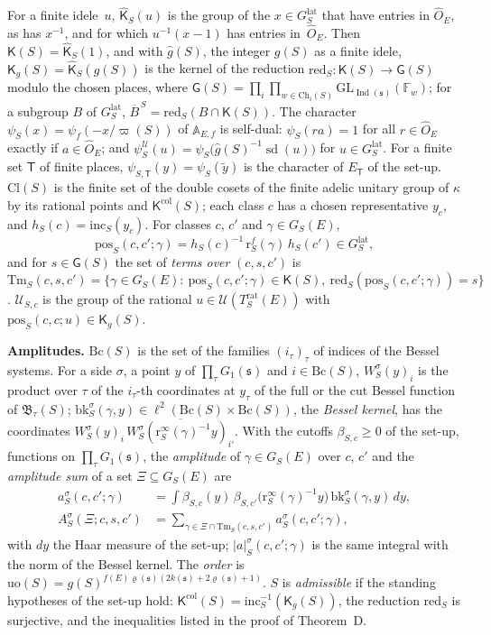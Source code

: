 \documentclass[11pt,a4paper]{article}
\newcommand{\F}{\mathbb{F}}
\newcommand{\m}[1]{\mbox{$#1$}}        %
\newcommand{\subhead}[1]{\par\addvspace{9pt plus 2pt}\Needspace{4\baselineskip}\noindent\textbf{#1}\enspace\ignorespaces}
\theoremstyle{plainx}
\theoremstyle{uprightx}
\newcommand{\fs}{\mathfrak{s}}                      %
\newcommand{\sT}{\mathsf{T}}                        %
\newcommand{\AEf}{\mathbb{A}_{E,f}}
\newcommand{\hO}{\hat{O}_E}
\newcommand{\GL}{\mathrm{GL}}
\newcommand{\rh}[1]{\varrho(#1)}                    %
\newcommand{\kk}[1]{k(#1)}                          %
\newcommand{\Ix}[1]{\operatorname{Ind}(#1)}                          %
\newcommand{\ninf}[1]{f(#1)}                        %
\newcommand{\ET}[1]{E_{#1}}                         %
\newcommand{\gS}[1]{g(#1)}                          %
\newcommand{\vpS}[1]{\varpi(#1)}                    %
\newcommand{\ChS}[2]{\mathrm{Ch}_{#2}(#1)}          %
\newcommand{\KcolS}[1]{\mathsf{K}^{\mathrm{col}}(#1)}        %
\newcommand{\BsysS}[2]{\mathfrak{B}_{#2}(#1)}       %
\newcommand{\Trat}[2]{T^{\mathrm{rat}}_{#1}(#2)}    %
\newcommand{\GS}[2]{G_{#1}(#2)}                     %
\newcommand{\GFin}[1]{G^{\mathrm{lat}}_{#1}}        %
\newcommand{\GRes}[1]{\mathsf{G}(#1)}               %
\newcommand{\Cl}[1]{\mathrm{Cl}(#1)}                %
\newcommand{\Bc}[1]{\mathrm{Bc}(#1)}                %
\newcommand{\KS}[1]{\mathsf{K}(#1)}                          %
\newcommand{\redS}[1]{\mathrm{red}_{#1}}            %
\newcommand{\KgS}[1]{\mathsf{K}_g(#1)}                       %
\newcommand{\redim}[2]{\overline{#2}^{\,#1}}        %
\newcommand{\gid}[1]{\hat{g}(#1)}                   %
\newcommand{\rinf}[1]{\mathrm{r}^{\infty}_{#1}}     %
\newcommand{\rfin}[1]{\mathrm{r}^{f}_{#1}}          %
\newcommand{\incH}[1]{\mathrm{inc}_{#1}}            %
\newcommand{\hc}[2]{h_{#1}(#2)}                     %
\newcommand{\pos}[4]{\mathrm{pos}_{#1}(#2,#3;#4)}   %
\newcommand{\terms}[4]{\mathrm{Tm}_{#1}(#2,#3,#4)}  %
\newcommand{\clU}[2]{\mathcal{U}_{#1,#2}}           %
\newcommand{\cutoff}[2]{\beta_{#1,#2}}              %
\newcommand{\besfn}[4]{W^{#1}_{#2}(#3)_{#4}}        %
\newcommand{\amp}[5]{a^{#1}_{#2}(#3,#4;#5)}         %
\newcommand{\ampabs}[5]{|a|^{#1}_{#2}(#3,#4;#5)}    %
\newcommand{\ampsum}[6]{A^{#1}_{#2}(#3;#4,#5,#6)}   %
\newcommand{\uchar}[2]{\psi^{\mathcal{U}}_{#1}(#2)} %
\newcommand{\uord}[1]{\mathrm{uo}(#1)}              %
\newcommand{\charT}[2]{\psi_{#1,#2}}                %
\newcommand{\UT}[1]{\mathcal{U}(#1)}                %
\newcommand{\sd}[1]{\operatorname{sd}(#1)}          %
\newcommand{\KA}[2]{\hat{\mathsf{K}}_{#1}(#2)}               %
\newcommand{\bker}[4]{\mathrm{bk}^{#1}_{#2}(#3,#4)} %
\newcommand{\psiS}[1]{\psi_{#1}}                     %
\begin{document}
For a finite idele~$u$, \m{\KA{S}{u}} is the group of the \m{x\in\GFin{S}} that have entries in \m{\hO}, as has
$x^{-1}$, and for which \m{u^{-1}(x-1)} has entries in~\m{\hO}. Then \m{\KS{S}=\KA{S}{1}}, and with \m{\gid{S}}, the
integer \m{\gS{S}} as a finite idele, \m{\KgS{S}=\KA{S}{\gid{S}}} is the kernel of the reduction
\m{\redS{S}\colon\KS{S}\to\GRes{S}} modulo the chosen places, where
\m{\GRes{S}=\prod_{i}\prod_{w\in\ChS{S}{i}}\GL_{\Ix{\fs}}(\F_w)}; for a subgroup $B$ of \m{\GFin{S}},
\m{\redim{S}{B}=\redS{S}(B\cap\KS{S})}. The character \m{\psiS{S}(x)=\psi_f(-x/\vpS{S})} of \m{\AEf} is self-dual:
\m{\psiS{S}(ra)=1} for all \m{r\in\hO} exactly if \m{a\in\hO}; and
\m{\uchar{S}{u}=\psiS{S}\bigl(\gid{S}^{-1}\sd{u}\bigr)} for \m{u\in\GFin{S}}. For a finite set $\sT$ of finite places,
\m{\charT{S}{\sT}(y)=\psiS{S}(\tilde y)} is the character of \m{\ET{\sT}} of the set-up. \m{\Cl{S}} is the finite set
of the double cosets of the finite adelic unitary group of $\kappa$ by its rational points and \m{\KcolS{S}};
each class $c$ has a chosen representative $y_c$, and \m{\hc{S}{c}=\incH{S}(y_c)}. For classes $c$, $c'$ and
\m{\gamma\in\GS{S}{E}},
\[\pos{S}{c}{c'}{\gamma}=\hc{S}{c}^{-1}\,\rfin{S}(\gamma)\,\hc{S}{c'}\in\GFin{S},\]
and for \m{s\in\GRes{S}} the set of \emph{terms over} \m{(c,s,c')} is
$\terms{S}{c}{s}{c'}=\{\gamma\in\GS{S}{E}:\ \pos{S}{c}{c'}{\gamma}\in\KS{S},\ \redS{S}(\pos{S}{c}{c'}{\gamma})=s\}$.
\m{\clU{S}{c}} is the group of the rational \m{u\in\UT{\Trat{S}{E}}} with \m{\pos{S}{c}{c}{u}\in\KgS{S}}.

\subhead{Amplitudes.} \m{\Bc{S}} is the set of the families \m{(i_\tau)_\tau} of indices of the Bessel systems. For
a side $\sigma$, a point $y$ of \m{\prod_\tau G_1(\fs)} and \m{i\in\Bc{S}}, \m{\besfn{\sigma}{S}{y}{i}} is the product
over $\tau$ of the $i_\tau$-th coordinates at $y_\tau$ of the full or the cut Bessel function of
\m{\BsysS{S}{\tau}}; \m{\bker{\sigma}{S}{\gamma}{y}\in\ell^2(\Bc{S}\times\Bc{S})}, the \emph{Bessel kernel}, has the
coordinates \m{\besfn{\sigma}{S}{y}{i}\,\overline{\besfn{\sigma}{S}{\rinf{S}(\gamma)^{-1}y}{i'}}}. With the cutoffs
\m{\cutoff{S}{c}\ge0} of the set-up, functions on \m{\prod_\tau G_1(\fs)}, the \emph{amplitude} of
\m{\gamma\in\GS{S}{E}} over $c$, $c'$ and the \emph{amplitude sum} of a set \m{\Xi\subseteq\GS{S}{E}} are
\begin{align*}\amp{\sigma}{S}{c}{c'}{\gamma}&=\int\cutoff{S}{c}(y)\,\cutoff{S}{c'}\bigl(\rinf{S}(\gamma)^{-1}y\bigr)\,\bker{\sigma}{S}{\gamma}{y}\,dy,\\
\ampsum{\sigma}{S}{\Xi}{c}{s}{c'}&=\sum_{\gamma\in\Xi\cap\terms{S}{c}{s}{c'}}\amp{\sigma}{S}{c}{c'}{\gamma},\end{align*}
with $dy$ the Haar measure of the set-up; \m{\ampabs{\sigma}{S}{c}{c'}{\gamma}} is the same integral with the norm of
the Bessel kernel. The \emph{order} is \m{\uord{S}=\gS{S}^{\ninf{E}\rh{\fs}(2\kk{\fs}+2\rh{\fs}+1)}}. $S$ is
\emph{admissible} if the standing hypotheses of the set-up hold: \m{\KcolS{S}=\incH{S}^{-1}(\KgS{S})}, the
reduction \m{\redS{S}} is surjective, and the inequalities listed in the proof of Theorem~D.
\end{document}

